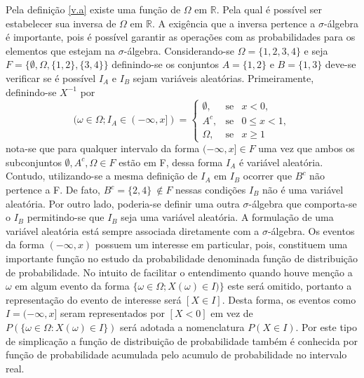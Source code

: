 Pela defini\c{c}\~{a}o \ref{v.a} existe uma fun\c{c}\~{a}o de $\Omega$ em $\mathbb{R}$. Pela qual \'e poss\'ivel
ser estabelecer sua inversa de $\Omega$ em $\mathbb{R}$. A exig\^{e}ncia que a inversa pertence a
$\sigma$-\'{a}lgebra \'{e} importante, pois \'{e} poss\'{i}vel garantir as opera\c{c}\~{o}es com as
probabilidades para os elementos que estejam na $\sigma$-\'{a}lgebra. Considerando-se $\Omega = \{1,2,3,4
\}$ e seja $ F = \{ \emptyset, \Omega, \{1,2 \}, \{3,4 \} \} $  definindo-se os conjuntos $A = \{1,2 \}$ e
$B = \{1,3 \}$ deve-se verificar se \'{e} poss\'{i}vel $I_A$ e $I_B$ sejam vari\'{a}veis
aleat\'{o}rias\cite{magalhaes}.  Primeiramente, definindo-se $X^{-1}$ por 
	\begin{equation*}
		( \omega \in\Omega; I_{A} \in (-\infty, x]) = \left\{
			\begin{array}{lcl} \emptyset, & \mbox {se} &  x < 0, \\ A^{c},
	   		& \mbox {se} &  0 \leq x < 1, \\ \Omega,    & \mbox {se} & x \geq 1 
   			\end{array} \right.
	\end{equation*} nota-se que para qualquer intervalo da forma  $ (-\infty, x ] \in F $ uma vez que
ambos os subconjuntos $\emptyset, A^{c}, \Omega \in F$ est\~ao em F, dessa forma $I_A$ \'{e}
vari\'{a}vel aleat\'{o}ria.  Contudo, utilizando-se a mesma defini\c{c}\~{a}o de $I_A$ em $I_B$ ocorrer
que $B^{c}$ n\~{a}o pertence a F. De fato, $B^{c} = \{2,4 \}\ \not \in F$ nessas condi\c c\~oes $I_B$
n\~{a}o \'{e} uma  vari\'{a}vel aleat\'{o}ria.  Por outro lado, poderia-se definir uma outra
$\sigma$-\'{a}lgebra que comporta-se o $I_B$ permitindo-se que $I_B$ seja uma vari\'{a}vel
aleat\'{o}ria. A formula\c{c}\~{a}o de uma vari\'{a}vel aleat\'oria est\'{a} sempre associada
diretamente  com a $\sigma$-\'{a}lgebra. Os eventos da forma $( - \infty, x)$ possuem um interesse em
particular, pois, constituem uma importante fun\c c\~ao no estudo da probabilidade denominada
fun\c{c}\~{a}o de distribui\c{c}\~{a}o de probabilidade. No intuito de facilitar o entendimento quando
houve men\c{c}\~{a}o a $\omega$ em algum evento da forma $ \{ \omega \in \Omega; X(\omega) \in I)\} $
este ser\'{a} omitido, portanto a representa\c c\~ao do evento de interesse ser\'a $ [ X \in I ]$.
Desta forma, os eventos como $I = (-\infty, x]$ seram representados por $[X < 0]$ em vez de $P(\{\omega \in
\Omega: X(\omega) \in I \})$ ser\'{a} adotada a nomenclatura $P(X \in I)$.  Por este tipo de
simplica\c{c}\~{a}o a fun\c{c}\~{a}o de distribui\c{c}\~{a}o de probabilidade tamb\'{e}m \'{e}
conhecida por fun\c{c}\~{a}o de probabilidade acumulada pelo acumulo de probabilidade no intervalo
real\cite{magalhaes}.

